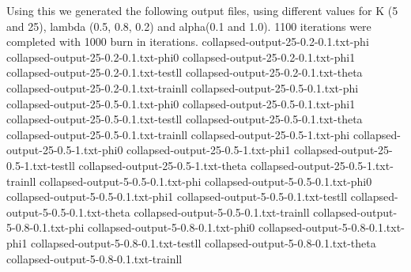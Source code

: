 \documentclass{article}
\begin{document}
Using this we generated the following output files, using different values for K (5 and 25), lambda (0.5, 0.8, 0.2)
and alpha(0.1 and 1.0). 1100 iterations were completed with 1000 burn in iterations.
collapsed-output-25-0.2-0.1.txt-phi
collapsed-output-25-0.2-0.1.txt-phi0
collapsed-output-25-0.2-0.1.txt-phi1
collapsed-output-25-0.2-0.1.txt-testll
collapsed-output-25-0.2-0.1.txt-theta
collapsed-output-25-0.2-0.1.txt-trainll
collapsed-output-25-0.5-0.1.txt-phi
collapsed-output-25-0.5-0.1.txt-phi0
collapsed-output-25-0.5-0.1.txt-phi1
collapsed-output-25-0.5-0.1.txt-testll
collapsed-output-25-0.5-0.1.txt-theta
collapsed-output-25-0.5-0.1.txt-trainll
collapsed-output-25-0.5-1.txt-phi
collapsed-output-25-0.5-1.txt-phi0
collapsed-output-25-0.5-1.txt-phi1
collapsed-output-25-0.5-1.txt-testll
collapsed-output-25-0.5-1.txt-theta
collapsed-output-25-0.5-1.txt-trainll
collapsed-output-5-0.5-0.1.txt-phi
collapsed-output-5-0.5-0.1.txt-phi0
collapsed-output-5-0.5-0.1.txt-phi1
collapsed-output-5-0.5-0.1.txt-testll
collapsed-output-5-0.5-0.1.txt-theta
collapsed-output-5-0.5-0.1.txt-trainll
collapsed-output-5-0.8-0.1.txt-phi
collapsed-output-5-0.8-0.1.txt-phi0
collapsed-output-5-0.8-0.1.txt-phi1
collapsed-output-5-0.8-0.1.txt-testll
collapsed-output-5-0.8-0.1.txt-theta
collapsed-output-5-0.8-0.1.txt-trainll

\end{document}
